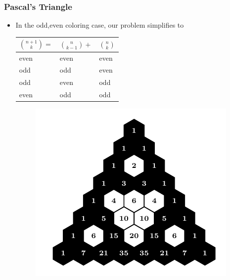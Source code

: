 \documentclass{beamer}
\begin{document}
\begin{frame}
    \frametitle{Pascal's Triangle}
    \begin{itemize}
        \item In the odd,even coloring case, our problem simplifies to
        \begin{minipage}{\textwidth}
            \begin{table}[H]
                \begin{tabular}{|lll|}
                    \hline
                    $\binom{n+1}{k} = $ & $\binom{n}{k-1} + $& $\binom{n}{k}$\\
                    \hline
                    even & even & even \\
                    odd  & odd  & even \\
                    odd  & even & odd  \\
                    even & odd & odd  \\
                    \hline
                \end{tabular}
            \end{table}
        \end{minipage}
        \begin{minipage}{\textwidth}
            \begin{figure}
                \centering
                \includegraphics[scale=0.7]{Mod2,7.pdf}
            \end{figure}
        \end{minipage}
    \end{itemize}
\end{frame}
\end{document}
